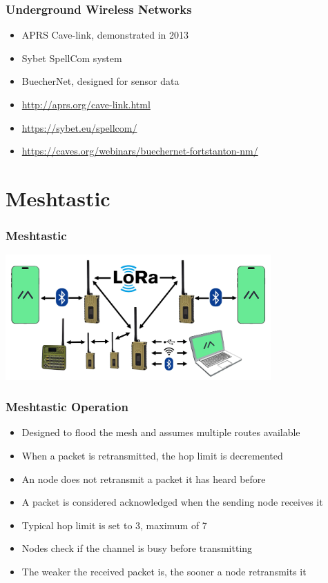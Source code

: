 \documentclass{beamer}
\begin{document}
\begin{frame}
\frametitle{Underground Wireless Networks}

\begin{itemize}
	\item APRS Cave-link, demonstrated in 2013
	\item Sybet SpellCom system
	\item BuecherNet, designed for sensor data
	\item \tiny\url{http://aprs.org/cave-link.html}
	\item \tiny\url{https://sybet.eu/spellcom/}
	\item \tiny\url{https://caves.org/webinars/buechernet-fortstanton-nm/}
\end{itemize}
\end{frame}

\section{Meshtastic}

\begin{frame}
\frametitle{Meshtastic}

\begin{center}
\includegraphics[width=4.0in]{../images/lora-topology-2.png}
\end{center}

\end{frame}


\begin{frame}

\frametitle{Meshtastic Operation}

\begin{itemize}
\item Designed to flood the mesh and assumes multiple routes available
\item When a packet is retransmitted, the hop limit is decremented
\item An node does not retransmit a packet it has heard before
\item A packet is considered acknowledged when the sending node receives it
\item Typical hop limit is set to 3, maximum of 7
\item Nodes check if the channel is busy before transmitting
\item The weaker the received packet is, the sooner a node retransmits it
\end{itemize}

\end{frame}
\end{document}
